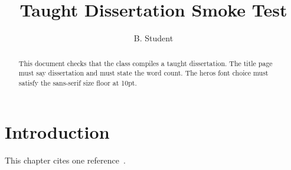 \documentclass[msc,font=heros,10pt,a4paper]{bangor}
\title{Taught Dissertation Smoke Test}
\author{B. Student}
\begin{document}
\maketitle
\statementspage
\begin{abstract}
  This document checks that the class compiles a taught dissertation.
  The title page must say dissertation and must state the word count.
  The heros font choice must satisfy the sans-serif size floor at 10pt.
\end{abstract}
\tables
\chapter{Introduction}
This chapter cites one reference~\autocite{knuth1984}.
\printbibliography
\end{document}
